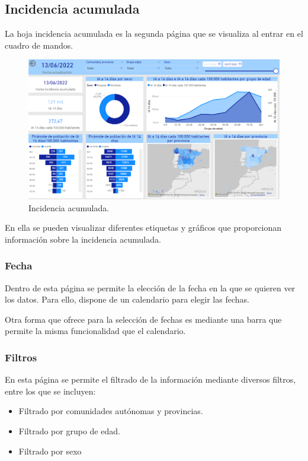 \subsection{Incidencia acumulada}
La hoja incidencia acumulada es la segunda página que se visualiza al entrar en el cuadro de mandos.
\begin{figure}[h]
    \advance{} 
    \includegraphics[scale=0.5]{img/powerBI_IA.PNG}
    \caption{Incidencia acumulada.}
\end{figure}
En ella se pueden visualizar diferentes etiquetas y gráficos que proporcionan información sobre la incidencia acumulada.
\newpage
\subsubsection{Fecha}
Dentro de esta página se permite la elección de la fecha en la que se quieren ver los datos.
Para ello, dispone de un calendario para elegir las fechas.

Otra forma que ofrece para la selección de fechas es mediante una barra que permite la misma funcionalidad que el calendario.

\subsubsection{Filtros}
En esta página se permite el filtrado de la información mediante diversos filtros, entre los que se incluyen:
\begin{itemize}
    \item Filtrado por comunidades autónomas y provincias.
    \item Filtrado por grupo de edad.
    \item Filtrado por sexo
\end{itemize}

